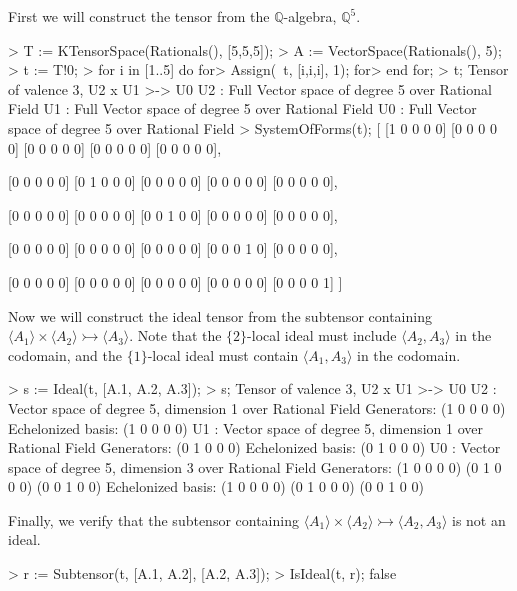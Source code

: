 \begin{example}[Ideals]

First we will construct the tensor from the $\mathbb{Q}$-algebra, $\mathbb{Q}^5$. 
\begin{code}
> T := KTensorSpace(Rationals(), [5,5,5]);
> A := VectorSpace(Rationals(), 5);
> t := T!0;
> for i in [1..5] do
for>   Assign(~t, [i,i,i], 1);
for> end for;
> t;
Tensor of valence 3, U2 x U1 >-> U0
U2 : Full Vector space of degree 5 over Rational Field
U1 : Full Vector space of degree 5 over Rational Field
U0 : Full Vector space of degree 5 over Rational Field
> SystemOfForms(t);
[
    [1 0 0 0 0]
    [0 0 0 0 0]
    [0 0 0 0 0]
    [0 0 0 0 0]
    [0 0 0 0 0],

    [0 0 0 0 0]
    [0 1 0 0 0]
    [0 0 0 0 0]
    [0 0 0 0 0]
    [0 0 0 0 0],

    [0 0 0 0 0]
    [0 0 0 0 0]
    [0 0 1 0 0]
    [0 0 0 0 0]
    [0 0 0 0 0],

    [0 0 0 0 0]
    [0 0 0 0 0]
    [0 0 0 0 0]
    [0 0 0 1 0]
    [0 0 0 0 0],

    [0 0 0 0 0]
    [0 0 0 0 0]
    [0 0 0 0 0]
    [0 0 0 0 0]
    [0 0 0 0 1]
]
\end{code}

Now we will construct the ideal tensor from the subtensor containing $\langle
A_1\rangle \times \langle A_2\rangle \rightarrowtail \langle A_3\rangle$. Note
that the $\{2\}$-local ideal must include $\langle A_2,A_3\rangle$ in the
codomain, and the $\{1\}$-local ideal must contain $\langle A_1,A_3\rangle$ in
the codomain. 
\begin{code}
> s := Ideal(t, [A.1, A.2, A.3]);
> s;
Tensor of valence 3, U2 x U1 >-> U0
U2 : Vector space of degree 5, dimension 1 over Rational Field
Generators:
(1 0 0 0 0)
Echelonized basis:
(1 0 0 0 0)
U1 : Vector space of degree 5, dimension 1 over Rational Field
Generators:
(0 1 0 0 0)
Echelonized basis:
(0 1 0 0 0)
U0 : Vector space of degree 5, dimension 3 over Rational Field
Generators:
(1 0 0 0 0)
(0 1 0 0 0)
(0 0 1 0 0)
Echelonized basis:
(1 0 0 0 0)
(0 1 0 0 0)
(0 0 1 0 0)
\end{code}

Finally, we verify that the subtensor containing $\langle A_1\rangle \times
\langle A_2\rangle \rightarrowtail \langle A_2, A_3\rangle$ is not an ideal. 
\begin{code}
> r := Subtensor(t, [A.1, A.2], [A.2, A.3]);
> IsIdeal(t, r);
false
\end{code}
\end{example}

